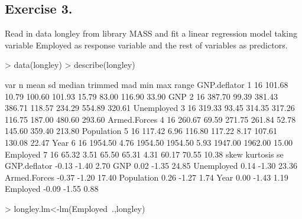 \documentclass[a4paper]{article}
\begin{document}
\subsection{Exercise 3.} Read in data longley from library MASS and fit a linear regression model taking variable 
Employed as response variable and the rest of variables as predictors.
\begin{Schunk}
\begin{Sinput}
> data(longley)
> describe(longley)
\end{Sinput}
\begin{Soutput}
             var  n    mean    sd  median trimmed    mad     min     max  range
GNP.deflator   1 16  101.68 10.79  100.60  101.93  15.79   83.00  116.90  33.90
GNP            2 16  387.70 99.39  381.43  386.71 118.57  234.29  554.89 320.61
Unemployed     3 16  319.33 93.45  314.35  317.26 116.75  187.00  480.60 293.60
Armed.Forces   4 16  260.67 69.59  271.75  261.84  52.78  145.60  359.40 213.80
Population     5 16  117.42  6.96  116.80  117.22   8.17  107.61  130.08  22.47
Year           6 16 1954.50  4.76 1954.50 1954.50   5.93 1947.00 1962.00  15.00
Employed       7 16   65.32  3.51   65.50   65.31   4.31   60.17   70.55  10.38
              skew kurtosis    se
GNP.deflator -0.13    -1.40  2.70
GNP           0.02    -1.35 24.85
Unemployed    0.14    -1.30 23.36
Armed.Forces -0.37    -1.20 17.40
Population    0.26    -1.27  1.74
Year          0.00    -1.43  1.19
Employed     -0.09    -1.55  0.88
\end{Soutput}
\begin{Sinput}
> longley.lm<-lm(Employed~.,longley)
\end{Sinput}
\end{Schunk}
\end{document}
